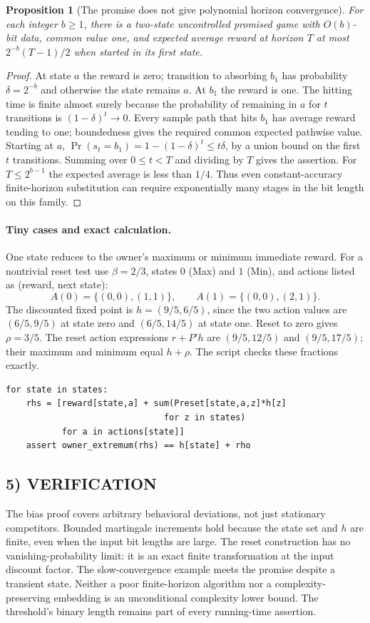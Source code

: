 \documentclass[11pt,a4paper]{article}
\newtheorem{proposition}[theorem]{Proposition}
\theoremstyle{definition}
\theoremstyle{remark}
\begin{document}
\begin{proposition}[The promise does not give polynomial horizon convergence]
For each integer $b\geq1$, there is a two-state uncontrolled promised game with $O(b)$-bit data, common value one, and expected average reward at horizon $T$ at most $2^{-b}(T-1)/2$ when started in its first state.
\end{proposition}
\begin{proof}
At state $a$ the reward is zero; transition to absorbing $b_1$ has probability $\delta=2^{-b}$ and otherwise the state remains $a$. At $b_1$ the reward is one. The hitting time is finite almost surely because the probability of remaining in $a$ for $t$ transitions is $(1-\delta)^t\to0$. Every sample path that hits $b_1$ has average reward tending to one; boundedness gives the required common expected pathwise value. Starting at $a$, $\Pr(s_t=b_1)=1-(1-\delta)^t\leq t\delta$, by a union bound on the first $t$ transitions. Summing over $0\leq t<T$ and dividing by $T$ gives the assertion. For $T\leq2^{b-1}$ the expected average is less than $1/4$. Thus even constant-accuracy finite-horizon substitution can require exponentially many stages in the bit length on this family.
\end{proof}

\paragraph{Tiny cases and exact calculation.}
One state reduces to the owner's maximum or minimum immediate reward. For a nontrivial reset test use $\beta=2/3$, states $0$ (Max) and $1$ (Min), and actions listed as (reward, next state):
\[
 A(0)=\{(0,0),(1,1)\},\qquad A(1)=\{(0,0),(2,1)\}.
\]
The discounted fixed point is $h=(9/5,6/5)$, since the two action values are $(6/5,9/5)$ at state zero and $(6/5,14/5)$ at state one. Reset to zero gives $\rho=3/5$. The reset action expressions $r+P'h$ are $(9/5,12/5)$ and $(9/5,17/5)$; their maximum and minimum equal $h+\rho$. The script checks these fractions exactly.
\begin{lstlisting}
for state in states:
    rhs = [reward[state,a] + sum(Preset[state,a,z]*h[z]
                               for z in states)
           for a in actions[state]]
    assert owner_extremum(rhs) == h[state] + rho
\end{lstlisting}

\subsection*{5) VERIFICATION}
The bias proof covers arbitrary behavioral deviations, not just stationary competitors. Bounded martingale increments hold because the state set and $h$ are finite, even when the input bit lengths are large. The reset construction has no vanishing-probability limit: it is an exact finite transformation at the input discount factor. The slow-convergence example meets the promise despite a transient state. Neither a poor finite-horizon algorithm nor a complexity-preserving embedding is an unconditional complexity lower bound. The threshold's binary length remains part of every running-time assertion.
\end{document}
